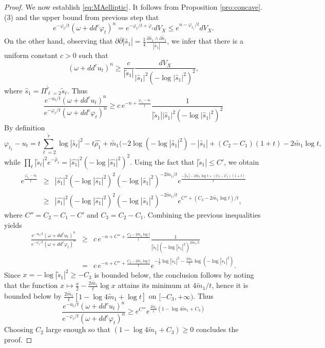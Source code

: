 \documentclass[11pt]{amsart}
\numberwithin{equation}{section}
\newcommand{\f}{\varphi}
\begin{document}
\begin{proof}
We now establish \eqref{eq:MAelliptic}.
It follows from Proposition \ref{pro:concave}.(3) and the upper bound from previous step that 
$$
e^{-{\f_t}/{t}}(\omega+dd^c \f_t)^n =e^{-{\f_t}/{t}+\dot{\varphi}_t}  dV_X \leq e^{n-{\f_{t_1}}/{t}} dV_X.
$$
On the other hand, observing that 
$\partial \overline{\partial} |\tilde{s_1}|= \frac{1}{4} \frac{\partial \tilde{s_1}\wedge \overline {\partial \tilde{s_1}}}{|\tilde{s_1}|}$, we infer that 
there is a uniform constant $c>0$ such that 
$$
(\omega+dd^c u_t)^n \geq \frac{c}{|\tilde{s}_1|} \frac{dV_X}{|\hat{s}_1|^2 (-\log |\hat{s}_1|^2)^2},
$$
where   $\hat{s}_1=\Pi_{\ell=2}^{\tilde{r}} \tilde{s}_{\ell}$.
Thus 
$$
 \frac{e^{-{u_t}/{t}}(\omega+dd^c u_t)^n}{e^{-{\varphi_t}/{t}}(\omega+dd^c \varphi_t)^n} \geq 
 c\, e^{-n+\frac{\f_{t_1}-u_t}{t}}  \frac{1}{|\tilde{s}_1||\hat{s}_1|^2 (-\log |\hat{s}_1|^2)^2 }
$$
By definition
$$
\f_{t_1}-u_t= t \sum_{\ell=2}^{\tilde{r}}  \log |\tilde{s_\ell}|^2 -t\hat{\rho_1} +\tilde{m_1} (-2\log (-\log |\tilde{s_1}|^2) -|\tilde{s_1}|+(C_2-C_1)(1+t)-2\tilde{m_1} \log t,
$$
while $\prod_\ell |\tilde{s}_\ell|^2e^{-\hat{\rho}_1}= |\hat{s_1}|^2 (-\log |\hat{s_1}|^2)^2$. 
Using the fact that $|\tilde{s}_1|\leq C'$, we obtain  
\begin{eqnarray*}
 e^{\frac{\f_{t_1}-u_t}{t}} &\geq &  |\hat{s_1}|^2 (-\log |\hat{s_1}|^2)^2 (-\log|\tilde{s_1}|^2)^{-2\tilde{m}_1/t} e^{\frac{-|\tilde{s}_1|-2\tilde{m_1}\log t+(C_2-C_1)(1+t)}{t}}\\
 &\geq & |\hat{s_1}|^2 (-\log |\hat{s_1}|^2)^2 (-\log|\tilde{s_1}|^2)^{-2\tilde{m}_1/t} e^{C''+(C_3-2\tilde{m_1}\log t)/{t}},
  \end{eqnarray*}
  where $C''=C_2-C_1-C'$ and $C_3=C_2-C_1$.
 Combining the previous inequalities yields
 \begin{eqnarray*}
 \frac{e^{-{u_t}/{t}}(\omega+dd^c u_t)^n}{e^{-{\varphi_t}/{t}}(\omega+dd^c \varphi_t)^n} &\geq &  c\, e^{-n +C''+\frac{C_3-2\tilde{m}_1 \log t}{t}} \frac{1}{|\tilde{s}_1| (-\log|\tilde{s}_1|^2)^{2\tilde{m}_1/t}}\\
 &=&   c\, e^{-n +C''+\frac{C_3-2\tilde{m}_1 \log t}{t}} e^{-\frac{1}{2}\log |\tilde{s}_1|^2 - \frac{2\tilde{m}_1}{t}\log(-\log|\tilde{s}_1|^2)}.
 \end{eqnarray*}
Since $x=-\log |\tilde{s}_1|^2 \geq -C_3$ is   bounded below, the conclusion follows by noting that 
the function $x \mapsto \frac{x}{2}-\frac{2\tilde{m_1}}{t} \log x$ attains its minimum at $4\tilde{m}_1/t$, 
hence it is bounded below
by $ \frac{2\tilde{m_1}}{t} [1-\log 4\tilde{m}_1 +\log t]$ on $[-C_3,+\infty)$. Thus
$$\frac{e^{-{u_t}/{t}}(\omega+dd^c u_t)^n}{e^{-{\varphi_t}/{t}}(\omega+dd^c \varphi_t)^n} \geq e^{C'''} e^{\frac{2\tilde{m}_1}{t} (1-\log 4\tilde{m}_1+C_3)}$$
Choosing $C_2$   large enough so that $(1-\log 4\tilde{m}_1+C_3) \geq 0$ concludes the proof.
\end{proof}
\end{document}

